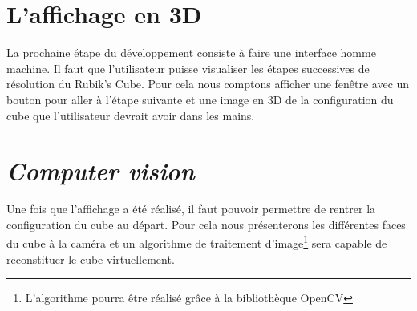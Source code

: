\section{L'affichage en 3D}
La prochaine étape du développement consiste à faire une interface homme machine. Il faut que l'utilisateur puisse visualiser les étapes successives de résolution du Rubik's Cube. Pour cela nous comptons afficher une fenêtre avec un bouton pour aller à l'étape suivante et une image en 3D de la configuration du cube que l'utilisateur devrait avoir dans les mains.

\section{\textit{Computer vision}}
Une fois que l'affichage a été réalisé, il faut pouvoir permettre de rentrer la configuration du cube au départ. Pour cela nous présenterons les différentes faces du cube à la caméra et un algorithme de traitement d'image\footnote{L'algorithme pourra être réalisé grâce à la bibliothèque OpenCV\cite{cite7}} sera capable de reconstituer le cube virtuellement.


